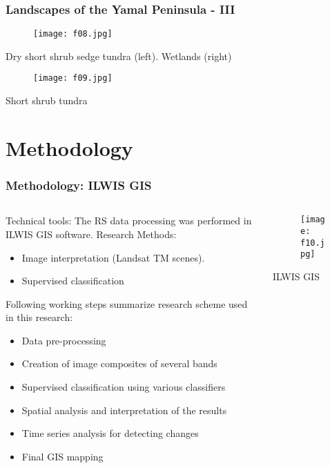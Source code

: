 \documentclass[pdflatex,compress,8pt,
	xcolor={dvipsnames,dvipsnames,svgnames,x11names,table},
	hyperref={colorlinks = true,
	breaklinks = true, 
	urlcolor = NavyBlue, 
	breaklinks = true}]{beamer}
\begin{document}
\begin{frame}\frametitle{Landscapes of the Yamal Peninsula - III}
\begin{figure}[H]
	\centering
		\texttt{[image: f08.jpg]}
\end{figure}
Dry short shrub sedge tundra (left). Wetlands (right)
\begin{figure}[H]
	\centering
		\texttt{[image: f09.jpg]}
\end{figure}
Short shrub tundra
\end{frame}

\section{Methodology}
\begin{frame}\frametitle{Methodology: ILWIS GIS}
\begin{minipage}[0.4\textheight]{\textwidth}
\begin{columns}[T]
\begin{column}{0.5\textwidth}
Technical tools: The RS data processing was performed in ILWIS GIS software.
Research Methods: 
\begin{itemize}
	\item Image interpretation (Landsat TM scenes).
	\item Supervised classification
\end{itemize}
Following working steps summarize research scheme used in this research:
\begin{itemize}
	\item Data pre-processing
	\item Creation of image composites of several bands
	\item Supervised classification using various classifiers 
	\item Spatial analysis and interpretation of the results
	\item Time series analysis for detecting changes
	\item Final GIS mapping
\end{itemize}
\end{column}
\begin{column}{0.5\textwidth}
\begin{figure}[H]
	\centering
		\texttt{[image: f10.jpg]}
\end{figure}
ILWIS GIS
\end{column}
\end{columns}
\end{minipage}
\end{frame}
\end{document}
